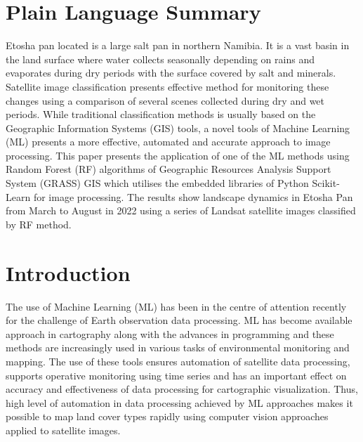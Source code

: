\documentclass[draft]{agujournal2019}
\begin{document}
\section*{Plain Language Summary}
Etosha pan located is a large salt pan in northern Namibia. It is a vast basin in the land surface where water collects seasonally depending on rains and evaporates during dry periods with the surface covered by salt and minerals. Satellite image classification presents effective method for monitoring these changes using a comparison of several scenes collected during dry and wet periods. While traditional classification methods is usually based on the Geographic Information Systems (GIS) tools, a novel tools of Machine Learning (ML) presents a more effective, automated and accurate approach to image processing. This paper presents the application of one of the ML methods using Random Forest (RF) algorithms of Geographic Resources Analysis Support System (GRASS) GIS which utilises the embedded libraries of Python Scikit-Learn for image processing. The results show landscape dynamics in Etosha Pan from March to August in 2022 using a series of Landsat satellite images classified by RF method.

%
%

 \section{Introduction}

The use of Machine Learning (ML) has been in the centre of attention recently for the challenge of Earth observation data processing. ML has become available approach in cartography along with the advances in programming and these methods are increasingly used in various tasks of environmental monitoring and mapping. The use of these tools ensures automation of satellite data processing, supports operative monitoring using time series and has an important effect on accuracy and effectiveness of data processing for cartographic visualization. Thus, high level of automation in data processing achieved by ML approaches makes it possible to map land cover types rapidly using computer vision approaches applied to satellite images.
\end{document}
